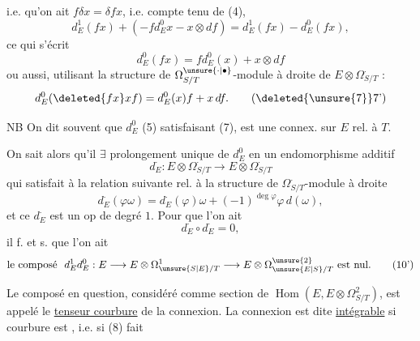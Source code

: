 i.e. qu'on ait $f\delta x=\delta fx$, i.e. compte tenu de (4),
\[
d_E^1(fx)+(-fd_E^0x-x\otimes df)=d_E^1(fx)-d_E^0(fx),
\]
ce qui s'écrit
\[
d_E^0(fx)=fd_E^0(x)+x\otimes df \tag*{(7)}
\]
ou aussi, utilisant la structure de $\Omega^{\unsure{\cdot|\bullet}}_{S/T}$-module
à droite de $E\otimes\Omega^{\cdot}_{S/T}$ :
\[
d_E^0(\deleted{fx}xf)=d_E^0(x)f+x\,df.\tag*{(\deleted{\unsure{7}}7')}
\]

NB On dit souvent que $d_E^0$ (5) satisfaisant (7), est une connex. sur $E$ rel. à $T$.

On sait alors qu'il $\exists$ prolongement unique de
$d_E^0$ en  un endomorphisme
additif
\[
d_E^{\cdot}:E\otimes\Omega^{\cdot}_{S/T}\longrightarrow E\otimes\Omega^{\cdot}_{S/T} \tag*{(8)}
\]
qui  satisfait à la relation suivante
rel. à la structure de $\Omega^{\cdot}_{S/T}$-module à droite
\[
d_E^{\cdot}(\varphi\omega)=d_E^{\cdot}(\varphi)\omega+
 (-1)^{\deg\varphi}\varphi\,d(\omega), \tag*{(9)}
\]
et ce $d_E^{\cdot}$ est un op de degré $1$. Pour que
l'on ait
\[
d_E^{\cdot}\circ d_E^{\cdot}=0, \tag*{(10)}
\]
il f. et s. que l'on ait
\[
\text{le composé }\ d_E^1d_E^0:E\longrightarrow E\otimes\Omega^1_{\unsure{S|E}/T}
\longrightarrow E\otimes\Omega^{\unsure{2}}_{\unsure{E|S}/T}\ \text{est nul.} \tag*{(10')}
\]

Le composé en question, considéré comme section
de $\operatorname{Hom}(E,E\otimes\Omega^2_{S/T})$, est appelé le \uline{tenseur courbure}
de la connexion. La connexion est dite \uline{intégrable}
si   courbure est , i.e. si  (8) fait
